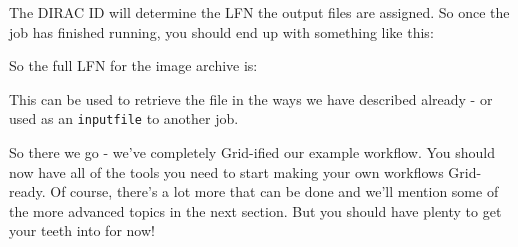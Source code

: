 The DIRAC ID will determine the LFN the output files are assigned. So
once the job has finished running, you should end up with something like
this:

\begin{Shaded}
\begin{Highlighting}[]
\NormalTok{$ } 
 

 \NormalTok{: }
            
\NormalTok{:/}\KeywordTok{>} 
\KeywordTok{>}
\NormalTok{:/}\KeywordTok{>} 
\NormalTok{:/}\KeywordTok{>} 
\end{Highlighting}
\end{Shaded}

So the full LFN for the image archive is:

\begin{Shaded}
\begin{Highlighting}[]
\end{Highlighting}
\end{Shaded}

This can be used to retrieve the file in the ways we have described
already - or used as an \texttt{inputfile} to another job.

So there we go - we've completely Grid-ified our example workflow. You
should now have all of the tools you need to start making your own
workflows Grid-ready. Of course, there's a lot more that can be done and
we'll mention some of the more advanced topics in the
next section.
But you should have plenty to get your teeth into for now!




